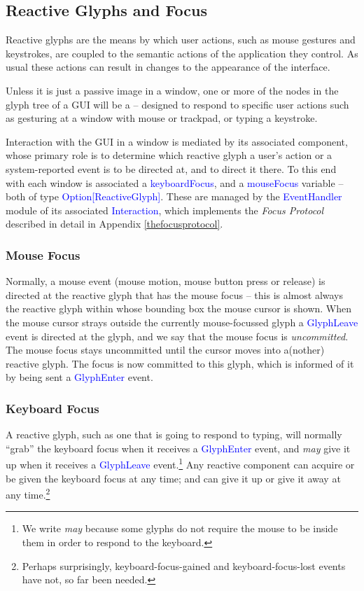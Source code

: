 \documentclass[12pt,a4paper]{article}
\def\Scala#1{\textcolor{blue}{\textsf{#1}}}
\def\SS#1{\subsection{#1}}
\def\SSS#1{\subsubsection*{#1}}
\begin{document}
\SS{Reactive Glyphs and Focus}

Reactive glyphs are the means by which user actions, such as mouse
gestures and keystrokes, are coupled to the semantic actions of the
application they control. As usual these actions can 
result in changes to the appearance of the interface.

Unless it is just a passive image in a window, one or more of the
nodes in the glyph tree of a GUI will be a 
-- designed to respond to specific user actions such as gesturing
at a window with mouse or trackpad, or typing a keystroke.

Interaction with the GUI in a window is mediated by its associated
 component, whose primary role is to determine
which reactive glyph a user's action or a system-reported event is
to be directed at, and to direct it there. To this end 
with each window is associated a \Scala{keyboardFocus}, and a
\Scala{mouseFocus}  variable -- both of type
\Scala{Option[ReactiveGlyph]}. These are managed by the
\Scala{EventHandler} module of its associated \Scala{Interaction},
which implements the \textit{Focus Protocol} described
in detail in Appendix \ref{thefocusprotocol}.

\SSS{Mouse Focus}
Normally, a mouse event (mouse motion, mouse button press or release)
is directed at the reactive glyph that has the mouse focus -- this
is almost always the reactive glyph within whose bounding box the mouse
cursor is shown. When the mouse cursor strays outside the currently
mouse-focussed glyph a \Scala{GlyphLeave} event is directed
at the glyph, and we say that the mouse focus is 
\textit{uncommitted}.  The mouse focus
stays uncommitted until the cursor moves into a(nother) reactive glyph.
The focus is now committed to this glyph, which is informed of it
by being sent a \Scala{GlyphEnter} event.

\SSS{Keyboard Focus}
A reactive glyph, such as  one that is going to respond to typing,
will normally ``grab'' the keyboard focus when it receives a
\Scala{GlyphEnter} event, and \textit{may} give it up when it
receives a \Scala{GlyphLeave} event.\footnote{We write \textit{may}
because some glyphs do not require the mouse to be inside them in
order to respond to the keyboard.} Any reactive component can acquire
or be given the keyboard focus at any time; and can give it up or give
it away at any time.\footnote{Perhaps surprisingly, keyboard-focus-gained and keyboard-focus-lost events
have not, so far been needed.}
\end{document}
